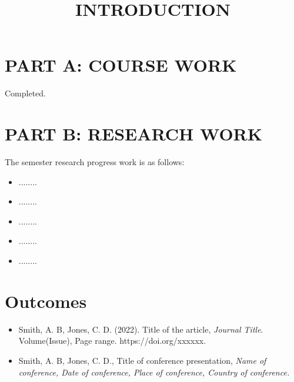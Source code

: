 \title{INTRODUCTION}

\section*{PART A: COURSE WORK}
Completed.
\section*{PART B: RESEARCH WORK}

The semester research progress work is as follows:
\begin{itemize}
\item ........
\item ........ 
\item ........
\item ........
\item ........
\end{itemize}


\section*{Outcomes}
\begin{itemize}
 \item Smith, A. B, Jones, C. D. (2022). Title of the article, 
 \emph{Journal Title}. Volume(Issue), Page range. https://doi.org/xxxxxx.

\item Smith, A. B, Jones, C. D., Title of conference presentation, \emph{Name of conference, Date of conference, Place of conference, Country of conference.}

\end{itemize}